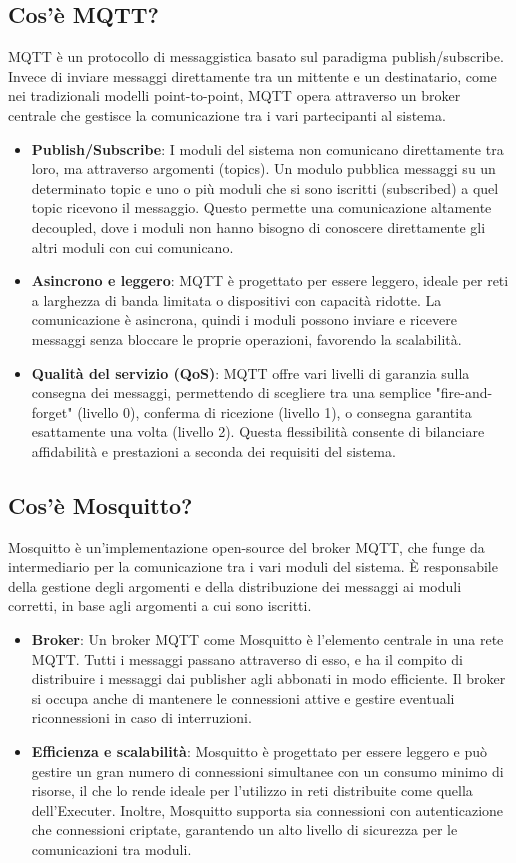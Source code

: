 \documentclass[target=bach,aauheader=,style=]{thud}
\begin{document}
\subsection{Cos'è MQTT?}
MQTT \cite{mqtt2024} è un protocollo di messaggistica basato sul paradigma publish/subscribe. Invece di inviare messaggi direttamente tra un mittente e un destinatario, come nei tradizionali modelli point-to-point, MQTT opera attraverso un broker centrale che gestisce la comunicazione tra i vari partecipanti al sistema.
\begin{itemize}
  \item \textbf{Publish/Subscribe}: I moduli del sistema non comunicano direttamente tra loro, ma attraverso argomenti (topics). Un modulo pubblica messaggi su un determinato topic e uno o più moduli che si sono iscritti (subscribed) a quel topic ricevono il messaggio. Questo permette una comunicazione altamente decoupled, dove i moduli non hanno bisogno di conoscere direttamente gli altri moduli con cui comunicano.
  \item \textbf{Asincrono e leggero}: MQTT è progettato per essere leggero, ideale per reti a larghezza di banda limitata o dispositivi con capacità ridotte. La comunicazione è asincrona, quindi i moduli possono inviare e ricevere messaggi senza bloccare le proprie operazioni, favorendo la scalabilità.
  \item \textbf{Qualità del servizio (QoS)}: MQTT offre vari livelli di garanzia sulla consegna dei messaggi, permettendo di scegliere tra una semplice "fire-and-forget" (livello 0), conferma di ricezione (livello 1), o consegna garantita esattamente una volta (livello 2). Questa flessibilità consente di bilanciare affidabilità e prestazioni a seconda dei requisiti del sistema.
\end{itemize}

\subsection{Cos'è Mosquitto?}
Mosquitto \cite{mosquitto2024} è un'implementazione open-source del broker MQTT, che funge da intermediario per la comunicazione tra i vari moduli del sistema. È responsabile della gestione degli argomenti e della distribuzione dei messaggi ai moduli corretti, in base agli argomenti a cui sono iscritti.
\begin{itemize}
  \item \textbf{Broker}: Un broker MQTT come Mosquitto è l'elemento centrale in una rete MQTT. Tutti i messaggi passano attraverso di esso, e ha il compito di distribuire i messaggi dai publisher agli abbonati in modo efficiente. Il broker si occupa anche di mantenere le connessioni attive e gestire eventuali riconnessioni in caso di interruzioni.
  \item \textbf{Efficienza e scalabilità}: Mosquitto è progettato per essere leggero e può gestire un gran numero di connessioni simultanee con un consumo minimo di risorse, il che lo rende ideale per l'utilizzo in reti distribuite come quella dell'Executer. Inoltre, Mosquitto supporta sia connessioni con autenticazione che connessioni criptate, garantendo un alto livello di sicurezza per le comunicazioni tra moduli.
\end{itemize}
\end{document}
